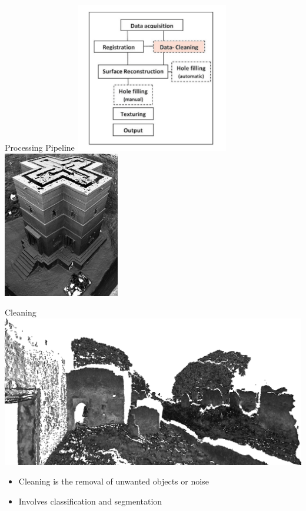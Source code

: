 \documentclass[compress]{beamer}
\begin{document}
\begin{frame}{Processing Pipeline}
  \includegraphics[width=0.50\textwidth]{pics/pipeline.png}
  \includegraphics[width=0.38\textwidth]{pics/zamani2.jpg}
\end{frame}

\begin{frame}{Cleaning}
\centering
  \includegraphics[width=1\textwidth]{pics/dirty}
  \begin{itemize}
  \item
  Cleaning is the removal of unwanted objects or noise
  \item
  Involves classification and segmentation
  \end{itemize}
\end{frame}
\end{document}
